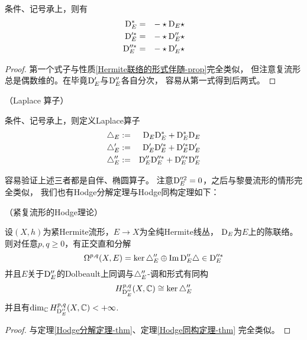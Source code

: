 \begin{prop}条件、记号承上，则有
\begin{eqnarray*}
\mathrm{D}_E^*&=&-\star \mathrm{D}_E\star\\
\mathrm{D}_E'^*&=&-\star \mathrm{D}_E''\star\\
\mathrm{D}_E''^*&=&-\star \mathrm{D}_E'\star
\end{eqnarray*}
\end{prop}

\begin{proof}
第一个式子与性质\ref{Hermite联络的形式伴随-prop}完全类似，
但注意复流形总是偶数维的。在毕竟$\mathrm{D}_E'$与$\mathrm{D}_E''$各自分次，
容易从第一式得到后两式。
\end{proof}

\begin{definition}（Laplace 算子）

条件、记号承上，则定义Laplace算子
\begin{eqnarray*}
\triangle_E&:=&\mathrm{D}_E\mathrm{D}_E^*+\mathrm{D}_E^*\mathrm{D}_E\\
\triangle_E'&:=&\mathrm{D}_E'\mathrm{D}_E'^*+\mathrm{D}_E'^*\mathrm{D}_E'\\
\triangle_E''&:=&\mathrm{D}_E''\mathrm{D}_E''^*+\mathrm{D}_E''^*\mathrm{D}_E''
\end{eqnarray*}
\end{definition}


容易验证上述三者都是自伴、椭圆算子。
注意$\mathrm{D}_E''^2=0$，之后与黎曼流形的情形完全类似，
我们也有Hodge分解定理与Hodge同构定理如下：

\begin{thm}（紧复流形的Hodge理论）
\label{紧复流形的Hodge理论-thm}

设$(X,h)$为紧Hermite流形，$E\to X$为全纯Hermite线丛，
$\mathrm{D}_E$为$E$上的陈联络。则对任意$p,q\geq 0$，有正交直和分解
$$
  \Omega^{p,q}(X,E)
=
  \ker\triangle_E''\oplus\operatorname{Im}\mathrm{D}_E''\triangle\in\mathrm{D}_E''^*
$$
并且$E$关于$\mathrm{D}_E''$的Dolbeault上同调与$\triangle_E''$-调和形式有同构
$$H^{p,q}_{\mathrm{D}_E''}(X,\mathbb{C})\cong\ker\triangle_E''$$
并且有$\dim_{\mathbb{C}}H^{p,q}_{\mathrm{D}_E''}(X,\mathbb{C})<+\infty$.
\end{thm}

\begin{proof}
与定理\ref{Hodge分解定理-thm}、定理\ref{Hodge同构定理-thm}
完全类似。
\end{proof}


